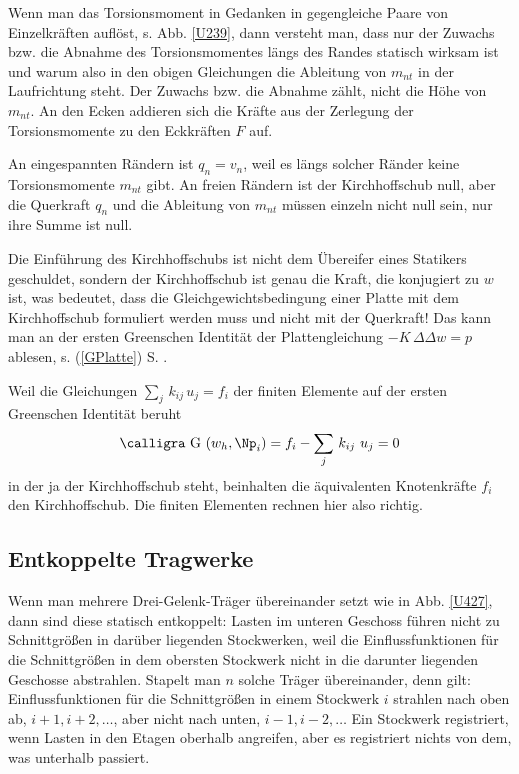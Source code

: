 {{Wenn man das Torsionsmoment in Gedanken in gegengleiche Paare von Einzelkr\"{a}ften aufl\"{o}st, s. Abb. \ref{U239}, dann versteht man, dass nur der Zuwachs bzw. die Abnahme des Torsionsmomentes l\"{a}ngs des Randes statisch wirksam ist und warum also in den obigen Gleichungen die Ableitung von $m_{nt}$ in der Laufrichtung steht. Der Zuwachs bzw. die Abnahme z\"{a}hlt, nicht die H\"{o}he von $m_{nt}$. An den Ecken addieren sich die Kr\"{a}fte aus der Zerlegung der Torsionsmomente zu den Eckkr\"{a}ften $F$ auf.

An eingespannten R\"{a}ndern ist $q_n = v_n$, weil es l\"{a}ngs solcher R\"{a}nder keine Torsionsmomente $m_{nt}$ gibt. An freien R\"{a}ndern ist der Kirchhoffschub null, aber die Querkraft $q_n$ und die Ableitung von $m_{nt}$ m\"{u}ssen einzeln nicht null sein, nur ihre Summe ist null.

Die Einf\"{u}hrung des Kirchhoffschubs ist nicht dem \"{U}bereifer eines Statikers geschuldet, sondern der Kirchhoffschub ist genau die Kraft, die konjugiert zu $w$ ist, was bedeutet, dass die Gleichgewichtsbedingung einer Platte mit dem Kirchhoffschub formuliert werden muss und nicht mit der Querkraft! Das kann man an der ersten Greenschen Identit\"{a}t der Plattengleichung $-K\,\Delta \Delta w = p$ ablesen, s. (\ref{GPlatte}) S. \pageref{GPlatte}.

Weil die Gleichungen $\sum_j\,k_{ij}\,u_j = f_i$ der finiten Elemente auf der ersten Greenschen Identit\"{a}t beruht
\begin{align}
\text{\normalfont\calligra G\,\,}(w_h,\Np_i) = f_i - \sum_j\,k_{ij}\,\,u_j = 0
\end{align}
in der ja der Kirchhoffschub steht, beinhalten die \"{a}quivalenten Knotenkr\"{a}fte $f_i$ den Kirchhoffschub. Die finiten Elementen rechnen hier also richtig.

{\textcolor{blau2}{\subsection{Entkoppelte Tragwerke}}}
Wenn man mehrere Drei-Gelenk-Tr\"{a}ger \"{u}bereinander setzt wie in Abb. \ref{U427}, dann sind diese statisch entkoppelt: Lasten im unteren Geschoss f\"{u}hren nicht zu Schnittgr\"{o}{\ss}en in dar\"{u}ber liegenden Stockwerken, weil die Einflussfunktionen f\"{u}r die Schnittgr\"{o}{\ss}en in dem obersten Stockwerk nicht in die darunter liegenden Geschosse abstrahlen. Stapelt man $n$ solche Tr\"{a}ger \"{u}bereinander, denn gilt: Einflussfunktionen f\"{u}r die Schnittgr\"{o}{\ss}en in einem Stockwerk $i$ strahlen nach oben ab, $i+1, i+2, \ldots$, aber nicht nach unten, $i -1, i-2, \ldots$ Ein Stockwerk registriert, wenn Lasten in den Etagen oberhalb angreifen, aber es registriert nichts von dem, was unterhalb passiert.

}}
